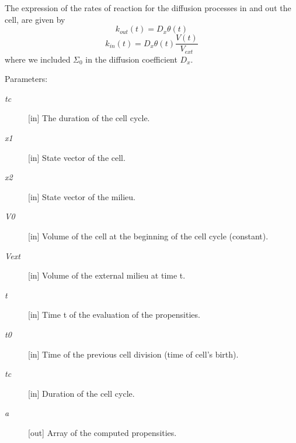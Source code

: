 The expression of the rates of reaction for the diffusion processes in and out the cell, are given by \[ k_{out}(t) = D_x \theta(t) \] \[ k_{in}(t) = D_x \theta(t) \frac{V(t)}{V_{ext}} \] where we included $ \Sigma_0 $ in the diffusion coefficient $ D_x $.

\begin{Desc}
\item[Parameters:]
\begin{description}
\item[{\em tc}][in] The duration of the cell cycle. \item[{\em x1}][in] State vector of the cell. \item[{\em x2}][in] State vector of the milieu. \item[{\em V0}][in] Volume of the cell at the beginning of the cell cycle (constant). \item[{\em Vext}][in] Volume of the external milieu at time t. \item[{\em t}][in] Time t of the evaluation of the propensities. \item[{\em t0}][in] Time of the previous cell division (time of cell's birth). \item[{\em tc}][in] Duration of the cell cycle. \item[{\em a}][out] Array of the computed propensities. \end{description}
\end{Desc}
